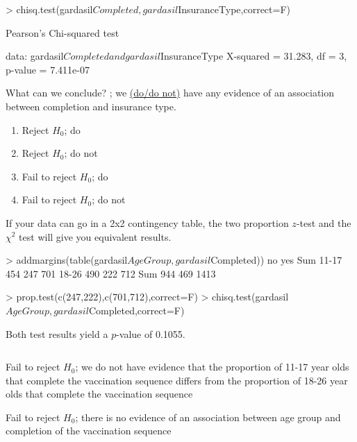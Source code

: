 \begin{frame}[fragile]
\begin{lcverbatim}
> chisq.test(gardasil$Completed,gardasil$InsuranceType,correct=F)

	Pearson's Chi-squared test

data:  gardasil$Completed and gardasil$InsuranceType
X-squared = 31.283, df = 3, p-value = 7.411e-07
\end{lcverbatim}
\begin{clicker}{What can we conclude? \underline{\hspace{1in}}; we \underline{(do/do not)} have any evidence of an association between completion and insurance type.}
\begin{enumerate}
    \item
    Reject $H_0$; do
    \item
    Reject $H_0$; do not
    \item
    Fail to reject $H_0$; do
    \item
    Fail to reject $H_0$; do not
\end{enumerate}
\end{clicker}
\end{frame}

\begin{frame}[fragile]
If your data can go in a 2x2 contingency table, the two proportion $z$-test and the $\chi^2$ test will give you equivalent results.\\
\begin{lcverbatim}
> addmargins(table(gardasil$AgeGroup,gardasil$Completed))
          no  yes  Sum
  11-17  454  247  701
  18-26  490  222  712
  Sum    944  469 1413

> prop.test(c(247,222),c(701,712),correct=F)
> chisq.test(gardasil$AgeGroup,gardasil$Completed,correct=F)
\end{lcverbatim}
Both test results yield a $p$-value of 0.1055.
\begin{columns}
\begin{itemize}
    \small{
    \item[Two sample z-test:] Fail to reject $H_0$; we do not have evidence that the proportion of 11-17 year olds that complete the vaccination sequence differs from the proportion of 18-26 year olds that complete the vaccination sequence
    \item[Chi-squared test:] Fail to reject $H_0$; there is no evidence of an association between age group and completion of the vaccination sequence}
\end{itemize}
\end{columns}
\end{frame}



